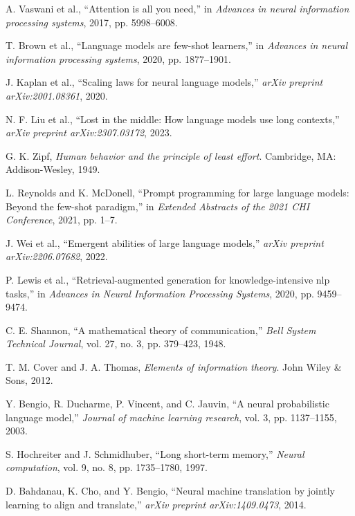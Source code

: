 \documentclass[conference]{IEEEtran}
\begin{document}
\begin{thebibliography}{99}

A. Vaswani et al., ``Attention is all you need,'' in \textit{Advances in neural information processing systems}, 2017, pp. 5998–6008.

T. Brown et al., ``Language models are few-shot learners,'' in \textit{Advances in neural information processing systems}, 2020, pp. 1877–1901.

J. Kaplan et al., ``Scaling laws for neural language models,'' \textit{arXiv preprint arXiv:2001.08361}, 2020.

N. F. Liu et al., ``Lost in the middle: How language models use long contexts,'' \textit{arXiv preprint arXiv:2307.03172}, 2023.

G. K. Zipf, \textit{Human behavior and the principle of least effort}. Cambridge, MA: Addison-Wesley, 1949.

L. Reynolds and K. McDonell, ``Prompt programming for large language models: Beyond the few-shot paradigm,'' in \textit{Extended Abstracts of the 2021 CHI Conference}, 2021, pp. 1–7.

J. Wei et al., ``Emergent abilities of large language models,'' \textit{arXiv preprint arXiv:2206.07682}, 2022.

P. Lewis et al., ``Retrieval-augmented generation for knowledge-intensive nlp tasks,'' in \textit{Advances in Neural Information Processing Systems}, 2020, pp. 9459–9474.

C. E. Shannon, ``A mathematical theory of communication,'' \textit{Bell System Technical Journal}, vol. 27, no. 3, pp. 379–423, 1948.

T. M. Cover and J. A. Thomas, \textit{Elements of information theory}. John Wiley \& Sons, 2012.

Y. Bengio, R. Ducharme, P. Vincent, and C. Jauvin, ``A neural probabilistic language model,'' \textit{Journal of machine learning research}, vol. 3, pp. 1137–1155, 2003.

S. Hochreiter and J. Schmidhuber, ``Long short-term memory,'' \textit{Neural computation}, vol. 9, no. 8, pp. 1735–1780, 1997.

D. Bahdanau, K. Cho, and Y. Bengio, ``Neural machine translation by jointly learning to align and translate,'' \textit{arXiv preprint arXiv:1409.0473}, 2014.


\end{thebibliography}
\end{document}
